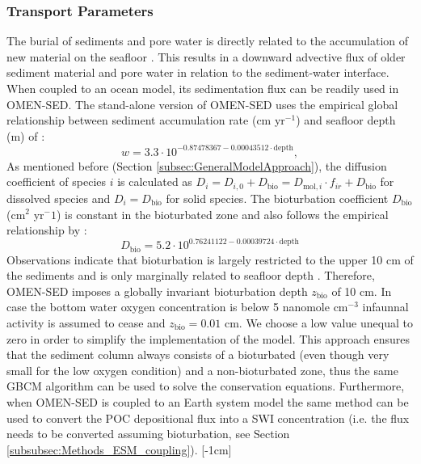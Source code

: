 \documentclass[gmd, manuscript]{copernicus}
\begin{document}
\subsubsection{Transport Parameters}
The burial of sediments and pore water is directly related to the accumulation of new material on the seafloor \citep[i.e. sedimentation,][]{burdige2006geochemistry}. 
This results in a downward advective flux of older sediment material and pore water in relation to the sediment-water interface. When coupled to an ocean model, its sedimentation flux can be readily used in OMEN-SED. 
The stand-alone version of OMEN-SED uses the empirical global relationship between sediment accumulation rate (cm yr$^{-1}$) and seafloor depth (m) of \citet{middelburg_empirical_1997}: 
\begin{equation}
 w = 3.3\cdot 10^{-0.87478367-0.00043512\cdot \text{depth}}\label{eq:sedimentation_rate},
\end{equation}
As mentioned before (Section \ref{subsec:GeneralModelApproach}), the diffusion coefficient of species $i$ is calculated as $D_i=D_{i,0}+D_{\mathrm{bio}}=D_{\mathrm{mol},i}\cdot f_{ir}+D_{\mathrm{bio}}$ for dissolved species and $D_i=D_{\mathrm{bio}}$ for solid species. 
The bioturbation coefficient $D_{\mathrm{bio}}$ (cm$^2$ yr$^-1$) is constant in the bioturbated zone and also follows the empirical relationship by \citet{middelburg_empirical_1997}:
\begin{equation}
 D_{\mathrm{bio}} = 5.2\cdot 10^{0.76241122-0.00039724\cdot \text{depth}}\label{eq:bioturbation_coeff}
\end{equation}
Observations indicate that bioturbation is largely restricted to the upper 10 cm of the sediments and is only marginally related to seafloor depth \citep[e.g.][]{boudreau_mean_1998, teal_global_2010}. 
Therefore, OMEN-SED imposes a globally invariant bioturbation depth $z_{\mathrm{bio}}$ of 10 cm. In case the bottom water oxygen concentration is below 5 nanomole cm$^{-3}$ 
infaunnal activity is assumed to cease and $z_{\mathrm{bio}} = 0.01$ cm. We choose a low value unequal to zero in order to simplify the implementation of the model. 
This approach ensures that the sediment column always consists of a bioturbated (even though very small for the low oxygen condition) and a non-bioturbated zone, 
thus the same GBCM algorithm can be used to solve the conservation equations. Furthermore, when OMEN-SED is coupled to an Earth system model 
the same method can be used to convert the POC depositional flux into a SWI concentration (i.e. the flux needs to be converted assuming bioturbation, see Section \ref{subsubsec:Methods_ESM_coupling}). 
[-1cm]%
\end{document}
